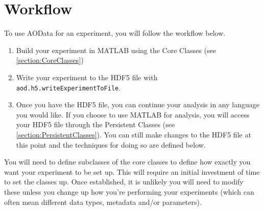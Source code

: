 \documentclass[10pt]{exam}
\newcommand\myurl[1]{\textcolor{blue}{\underline{#1}}}
\newcommand\aodfcn[1]{\textcolor{darkteal}{\texttt{#1}}}
\begin{document}
\section{Workflow}
	\label{section:Workflow}
	\noindent To use AOData for an experiment, you will follow the workflow below. 
	\begin{enumerate}
		\item Build your experiment in MATLAB using the Core Classes (see \myurl{\ref{section:CoreClasses}})
		\item Write your experiment to the HDF5 file with \aodfcn{aod.h5.writeExperimentToFile}.
		\item Once you have the HDF5 file, you can continue your analysis in any language you would like. If you choose to use MATLAB for analysis, you will access your HDF5 file through the Persistent Classes (see \myurl{\ref{section:PersistentClasses}}). You can still make changes to the HDF5 file at this point and the techniques for doing so are defined below.
	\end{enumerate}
	\noindent You will need to define subclasses of the core classes to define how exactly you want your experiment to be set up. This will require an initial investment of time to set the classes up. Once established, it is unlikely you will need to modify these unless you change up how you're performing your experiments (which can often mean different data types, metadata and/or parameters). 
\end{document}
